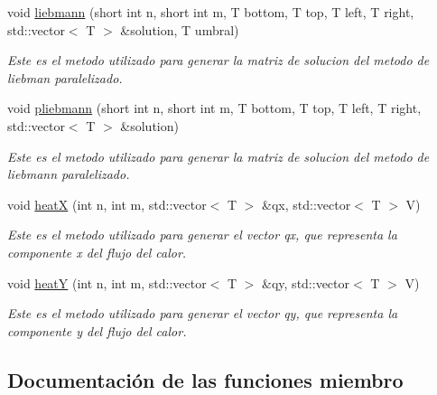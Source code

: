 \begin{DoxyCompactItemize}
\item 
void \hyperlink{classmethods_1_1Liebmann_a883dbcefab3121f882abefd7740fe057}{liebmann} (short int n, short int m, T bottom, T top, T left, T right, std\+::vector$<$ T $>$ \&solution, T umbral)
\begin{DoxyCompactList}\small\item\em Este es el metodo utilizado para generar la matriz de solucion del metodo de liebman paralelizado. \end{DoxyCompactList}\item 
void \hyperlink{classmethods_1_1Liebmann_aa89b8c2b82ca711b58fa318b1279ace0}{pliebmann} (short int n, short int m, T bottom, T top, T left, T right, std\+::vector$<$ T $>$ \&solution)
\begin{DoxyCompactList}\small\item\em Este es el metodo utilizado para generar la matriz de solucion del metodo de liebmann paralelizado. \end{DoxyCompactList}\item 
void \hyperlink{classmethods_1_1Liebmann_a21db65627b967d86d1cd5fd0c60e9cfb}{heatX} (int n, int m, std\+::vector$<$ T $>$ \&qx, std\+::vector$<$ T $>$ V)
\begin{DoxyCompactList}\small\item\em Este es el metodo utilizado para generar el vector qx, que representa la componente x del flujo del calor. \end{DoxyCompactList}\item 
void \hyperlink{classmethods_1_1Liebmann_ade173b06f3fb835d5bab07c9307052db}{heatY} (int n, int m, std\+::vector$<$ T $>$ \&qy, std\+::vector$<$ T $>$ V)
\begin{DoxyCompactList}\small\item\em Este es el metodo utilizado para generar el vector qy, que representa la componente y del flujo del calor. \end{DoxyCompactList}\end{DoxyCompactItemize}


\subsection{Documentación de las funciones miembro}
